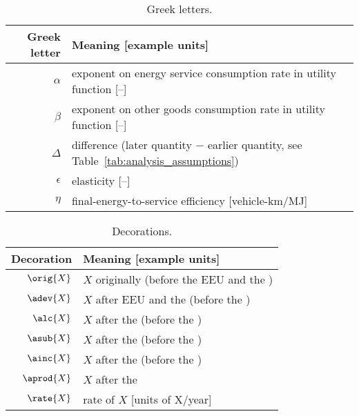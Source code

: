 \begin{table}
\centering %
\caption{Greek letters.}
\begin{tabular}{r l}
  \toprule
  Greek letter & Meaning [example units] \\
  \midrule
  $\alpha$ & exponent on energy service consumption rate in utility function [--] \\
  $\beta$  & exponent on other goods consumption rate in utility function [--] \\
  $\Delta$ & difference (later quantity $-$ earlier quantity, see Table~\ref{tab:analysis_assumptions}) \\
  $\epsilon$ & elasticity [--] \\
  $\eta$ & final-energy-to-service efficiency [vehicle-km/MJ] \\
  \bottomrule
\end{tabular}
\label{tab:greek}
\end{table}



\begin{table}
\centering %
\caption{Decorations.}
\begin{tabular}{r l}
  \toprule
  Decoration & Meaning [example units] \\
  \midrule
  $\orig{X}$ & $X$ originally (before the EEU and the \deveffect{}) \\
  $\adev{X}$ & $X$ after EEU and the \deveffect{} (before the \lceffect{}) \\
  $\alc{X}$  & $X$ after the \lceffect{} (before the \subeffect{}) \\
  $\asub{X}$ & $X$ after the \subeffect{} (before the \inceffect{}) \\
  $\ainc{X}$ & $X$ after the \inceffect{} (before the \prodeffect{}) \\
  $\aprod{X}$ & $X$ after the \prodeffect{} \\
  $\rate{X}$ & rate of $X$ [units of X/year] \\
  \bottomrule
\end{tabular}
\label{tab:decorations}
\end{table}



